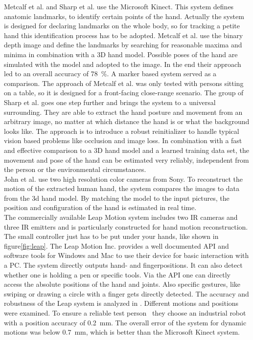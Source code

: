 Metcalf et al. and Sharp et al. use the Microsoft Kinect. This system defines anatomic landmarks, to identify certain points of the hand. Actually the system is designed for declaring landmarks on the whole body, so for tracking a petite hand this identification process has to be adopted. Metcalf et al. use the binary depth image and define the landmarks by searching for reasonable maxima and minima in combination with a 3D hand model. Possible poses of the hand are simulated with the model and adopted to the image. In the end their approach led to an overall accuracy of \SI{78}{\percent}. A marker based system served as a comparison. The approach of Metcalf et al. was only tested with persons sitting on a table, so it is designed for a front-facing close-range scenario.  The group of Sharp et al. goes one step further and brings the system to a universal surrounding. They are able to extract the hand posture and movement from an arbitrary image, no matter at which distance the hand is or what the background looks like. The approach is to introduce a robust reinitializer to handle typical vision based problems like occlusion and image loss. In combination with a fast and effective comparison to a 3D hand model and a learned training data set, the movement and pose of the hand can be estimated very reliably, independent from the person or the environmental circumstances.\\
John et al. use two high resolution color cameras from Sony. To reconstruct the motion of the extracted human hand, the system compares the images to data from the 3d hand model. By matching the model to the input pictures, the position and configuration of the hand is estimated in real time.\\
The commercially available Leap Motion system \cite{leap} includes two IR cameras and three IR emitters and is particularly constructed for hand motion reconstruction. The small controller just has to be put under your hands, like shown in figure\ref{fig:leap}. The Leap Motion Inc. provides a well documented API and software tools for Windows and Mac to use their device for basic interaction with a PC. The system directly outputs hand- and fingerpositions. It can also detect whether one is holding a pen or specific tools. Via the API one can directly access the absolute positions of the hand and joints. Also specific gestures, like swiping or drawing a circle with a finger gets directly detected. The accuracy and robustness of the Leap system is analyzed in \cite{weichert2013analysis}. Different motions and positions were examined. To ensure a reliable \grqq test person\grqq~ they choose an industrial robot with a position accuracy of \SI{0.2}{mm}. The overall error of the system for dynamic motions was below \SI{0.7}{\mm}, which is better than the Microsoft Kinect system.\\

